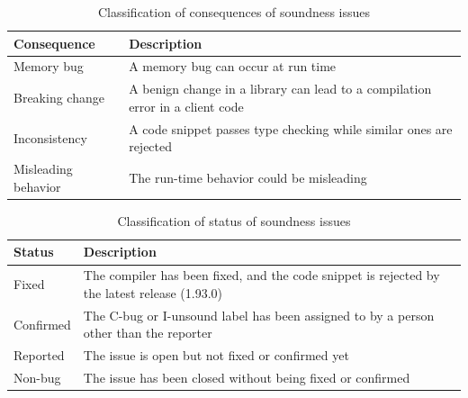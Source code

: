 \begin{table}[t]
\caption{Classification of consequences of soundness issues}
\label{tab:consequences}
\vspace{-1.15em}
\renewcommand{\arraystretch}{0.9}
  {\scriptsize
\begin{tabular}{l|l}
  Consequence & Description \\ \hline
  Memory bug & A memory bug can occur at run time \\
  Breaking change & A benign change in a library can lead to a compilation error in a client code \\
  Inconsistency & A code snippet passes type checking while similar ones are rejected \\
  Misleading behavior & The run-time behavior could be misleading \\
\end{tabular}
  }
\vspace{-0.65em}
\end{table}

\begin{table}[t]
\caption{Classification of status of soundness issues}
\label{tab:status-kind}
\vspace{-1.15em}
\renewcommand{\arraystretch}{0.9}
  {\scriptsize
\begin{tabular}{l|l}
  Status & Description \\ \hline
  Fixed & The compiler has been fixed, and the code snippet is rejected by the latest release (1.93.0) \\
  Confirmed & The C-bug or I-unsound label has been assigned to by a person other than the reporter\\
  Reported & The issue is open but not fixed or confirmed yet \\
  Non-bug & The issue has been closed without being fixed or confirmed \\
\end{tabular}
  }
\vspace{-1.0em}
\end{table}

